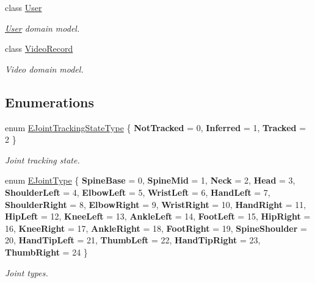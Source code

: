 \begin{DoxyCompactItemize}
class \mbox{\hyperlink{class_bar_none_1_1_shared_1_1_domain_model_1_1_user}{User}}
\begin{DoxyCompactList}\small\item\em \mbox{\hyperlink{class_bar_none_1_1_shared_1_1_domain_model_1_1_user}{User}} domain model. \end{DoxyCompactList}\item 
class \mbox{\hyperlink{class_bar_none_1_1_shared_1_1_domain_model_1_1_video_record}{Video\+Record}}
\begin{DoxyCompactList}\small\item\em Video domain model. \end{DoxyCompactList}\end{DoxyCompactItemize}
\subsection*{Enumerations}
\begin{DoxyCompactItemize}
\item 
enum \mbox{\hyperlink{namespace_bar_none_1_1_shared_1_1_domain_model_abfb99d1de9684cc3f024f727b2a2b487}{E\+Joint\+Tracking\+State\+Type}} \{ {\bfseries Not\+Tracked} = 0, 
{\bfseries Inferred} = 1, 
{\bfseries Tracked} = 2
 \}
\begin{DoxyCompactList}\small\item\em Joint tracking state. \end{DoxyCompactList}\item 
enum \mbox{\hyperlink{namespace_bar_none_1_1_shared_1_1_domain_model_a1aeba40858ef83a78921f013cdabb369}{E\+Joint\+Type}} \{ \newline
{\bfseries Spine\+Base} = 0, 
{\bfseries Spine\+Mid} = 1, 
{\bfseries Neck} = 2, 
{\bfseries Head} = 3, 
\newline
{\bfseries Shoulder\+Left} = 4, 
{\bfseries Elbow\+Left} = 5, 
{\bfseries Wrist\+Left} = 6, 
{\bfseries Hand\+Left} = 7, 
\newline
{\bfseries Shoulder\+Right} = 8, 
{\bfseries Elbow\+Right} = 9, 
{\bfseries Wrist\+Right} = 10, 
{\bfseries Hand\+Right} = 11, 
\newline
{\bfseries Hip\+Left} = 12, 
{\bfseries Knee\+Left} = 13, 
{\bfseries Ankle\+Left} = 14, 
{\bfseries Foot\+Left} = 15, 
\newline
{\bfseries Hip\+Right} = 16, 
{\bfseries Knee\+Right} = 17, 
{\bfseries Ankle\+Right} = 18, 
{\bfseries Foot\+Right} = 19, 
\newline
{\bfseries Spine\+Shoulder} = 20, 
{\bfseries Hand\+Tip\+Left} = 21, 
{\bfseries Thumb\+Left} = 22, 
{\bfseries Hand\+Tip\+Right} = 23, 
\newline
{\bfseries Thumb\+Right} = 24
 \}
\begin{DoxyCompactList}\small\item\em Joint types. \end{DoxyCompactList}\end{DoxyCompactItemize}



